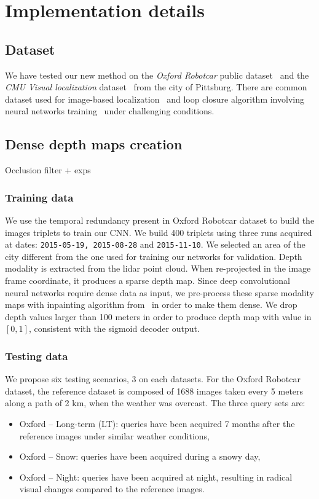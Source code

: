 \section{Implementation details}
\label{sec:impl_details}



\subsection{Dataset}
\label{subsec:dataset}
	We have tested our new method on the \textit{Oxford Robotcar} public dataset~\cite{Maddern2016} and the \textit{CMU Visual localization} dataset~\cite{Bansal2014a} from the city of Pittsburg. There are common dataset used for image-based localization~\cite{Sattler2018} and loop closure algorithm involving neural networks training~\cite{Porav2018} under challenging conditions.
		
\subsection{Dense depth maps creation}
Occlusion filter + exps
		
\subsubsection{Training data}
	We use the temporal redundancy present in Oxford Robotcar dataset to build the images triplets to train our CNN. We build 400 triplets using three runs acquired at dates: \texttt{2015-05-19, 2015-08-28} and \texttt{2015-11-10}. We selected an area of the city different from the one used for training our networks for validation.
	Depth modality is extracted from the lidar point cloud. When re-projected in the image frame coordinate, it produces a sparse depth map. Since deep convolutional neural networks require dense data as input, we pre-process these sparse modality maps with inpainting algorithm from~\cite{Bevilacqua2017} in order to make them dense. We drop depth values larger than 100 meters in order to produce depth map with value in $[0, 1]$, consistent with the sigmoid decoder output.

\subsubsection{Testing data}
We propose six testing scenarios, 3 on each datasets. For the Oxford Robotcar dataset, the reference dataset is composed of 1688 images taken every 5 meters along a path of 2 km, when the weather was overcast. The three query sets are:
\begin{itemize}
	\item {Oxford -- Long-term (LT):} queries have been acquired 7 months after the reference images under similar weather conditions,
	\item {Oxford -- Snow:} queries have been acquired during a snowy day,
	\item {Oxford -- Night:} queries have been acquired at night, resulting in radical visual changes compared to the reference images.
\end{itemize}

